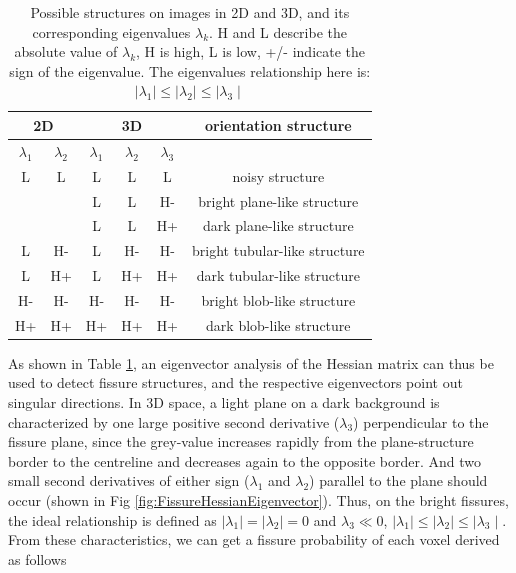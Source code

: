 {\begin{table}[h]
\centering
\caption{Possible structures on images in 2D and 3D, and its corresponding eigenvalues $\lambda_k$. H and L describe the absolute value of $\lambda_k$, H is high, L is low, +/- indicate the sign of the eigenvalue. The eigenvalues relationship here is: $\mid\lambda_{1}\mid\leq\mid\lambda_{2}\mid\leq\mid\lambda_{3}\mid$}
\label{tab:Hessian-based eigenvalue analysis}
\begin{tabular}{c c | c c c | c}
\hline
\multicolumn{2}{c|}{\bf{2D}} & \multicolumn{3}{c|}{\bf{3D}} & \bf{orientation structure}\\ 
\hline
$\lambda_1$ & $\lambda_2$ &  $\lambda_1$ & $\lambda_2$ & $\lambda_3$ &  \\
\hline
   L      &     L     &      L     &     L     &      L     & noisy structure \\
          &           &      L     &     L     &      H-    & bright plane-like structure \\
          &           &      L     &     L     &      H+    & dark plane-like structure \\
   L      &     H-    &      L     &     H-    &      H-    & bright tubular-like structure \\
   L      &     H+    &      L     &     H+    &      H+    & dark tubular-like structure \\
   H-     &     H-    &      H-    &     H-    &      H-    & bright blob-like structure \\	
   H+     &     H+    &      H+    &     H+    &      H+    & dark blob-like structure \\												
\hline
\end{tabular}
\end{table}

As shown in Table \ref{tab:Hessian-based eigenvalue analysis}, an eigenvector analysis of the Hessian matrix can thus be used to detect fissure structures, and the respective eigenvectors point out singular directions. In 3D space, a light plane on a dark background is characterized by one large positive second derivative ($\lambda_3$) perpendicular to the fissure plane, since the grey-value increases rapidly from the plane-structure border to the centreline and decreases again to the opposite border. And two small second derivatives of either sign ($\lambda_1$ and $\lambda_2$) parallel to the plane should occur (shown in Fig \ref{fig:FissureHessianEigenvector}). Thus, on the bright fissures, the ideal relationship is defined as $\mid\lambda_{1}\mid = \mid\lambda_{2}\mid = 0$ and $\lambda_{3} \ll 0$, $\mid\lambda_{1}\mid\leq\mid\lambda_{2}\mid\leq\mid\lambda_{3}\mid$. From these characteristics, we can get a fissure probability of each voxel derived as follows

}
